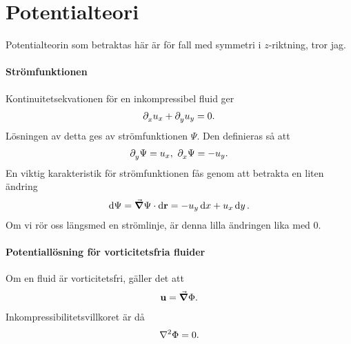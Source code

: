 \section{Potentialteori}
Potentialteorin som betraktas här är för fall med symmetri i $z$-riktning, tror jag.

\paragraph{Strömfunktionen}
Kontinuitetsekvationen för en inkompressibel fluid ger
\begin{align*}
	\partial_{x}^{}u_{x} + \partial_{y}^{}u_{y} = 0.
\end{align*}
Lösningen av detta ges av strömfunktionen $\Psi$. Den definieras så att
\begin{align*}
	\partial_{y}^{}\Psi = u_{x},\ \partial_{x}^{}\Psi = -u_{y}.
\end{align*}
En viktig karakteristik för strömfunktionen fås genom att betrakta en liten ändring
\begin{align*}
	\dd{\Psi} = \grad{\Psi}\cdot\dd{\vb{r}} = -u_{y}\dd{x} + u_{x}\dd{y}.
\end{align*}
Om vi rör oss längsmed en strömlinje, är denna lilla ändringen lika med $0$.

\paragraph{Potentiallösning för vorticitetsfria fluider}
Om en fluid är vorticitetsfri, gäller det att
\begin{align*}
	\vb{u} = \grad{\Phi}.
\end{align*}
Inkompressibilitetsvillkoret är då
\begin{align*}
	\laplacian{\Phi} = 0.
\end{align*}

